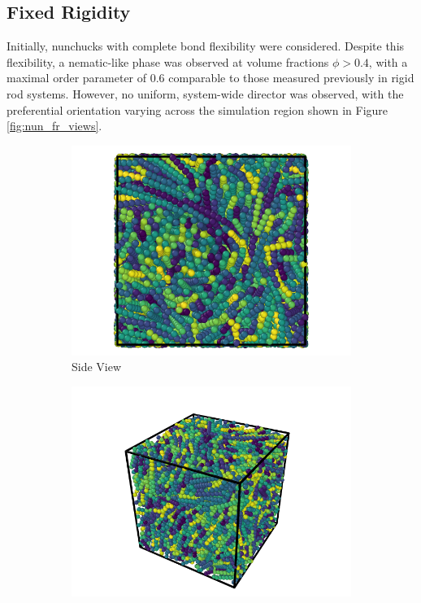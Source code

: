 \documentclass[11pt, a4paper]{article} %
\begin{document}
\subsection{Fixed Rigidity}
Initially, nunchucks with complete bond flexibility were considered. Despite this flexibility, a nematic-like phase was observed at volume fractions $\phi > 0.4$, with a maximal order parameter of \num{0.6} comparable to those measured previously in rigid rod systems. However, no uniform, system-wide director was observed, with the preferential orientation varying across the simulation region shown in Figure \ref{fig:nun_fr_views}.


\begin{figure}
	\centering
	\begin{subfigure}{.5\textwidth}
		\centering
		\includegraphics[width=.9\linewidth]{Figures/nun_fr_side}
		\caption{Side View}
		\label{fig:nun_fr_side}
	\end{subfigure}%
	\begin{subfigure}{.5\textwidth}
		\centering
		\includegraphics[width=.9\linewidth]{Figures/nun_fr_perspective}

\end{subfigure}
\end{figure}
\end{document}
